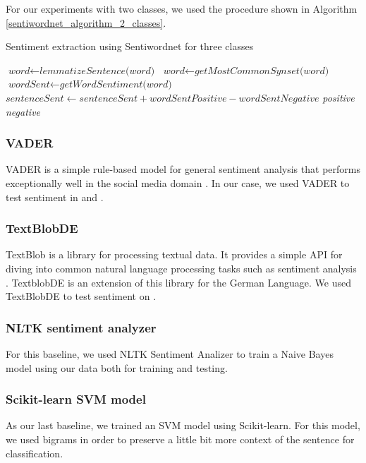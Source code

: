 For our experiments with two classes, we used the procedure shown in Algorithm \ref{sentiwordnet_algorithm_2_classes}.
\begin{algorithm}[h]
\caption{Sentiment extraction using Sentiwordnet for three classes}\label{euclid}
\label{sentiwordnet_algorithm_2_classes}
\begin{algorithmic}[1]
\State $\textit{word} \gets \textit{lemmatizeSentence(word)}$
\State $\textit{word} \gets \textit{getMostCommonSynset(word)}$
\State $\textit{wordSent} \gets \textit{getWordSentiment(word)}$
\State $\textit{sentenceSent} \gets \textit{sentenceSent} + \textit{wordSentPositive} - \textit{wordSentNegative}$
\EndFor
{}
    \Return \textit{positive}
\Else
    \Return \textit{negative}
\EndIf
\EndProcedure
\end{algorithmic}
\end{algorithm}
\subsubsection{VADER}
VADER is a simple rule-based model for general sentiment  analysis that performs  exceptionally well  in  the  social  media  domain \cite{VADERarticle}.
In our case, we used VADER to test sentiment in {\dataEN} and {\dataORG}.
\subsubsection{TextBlobDE}
TextBlob is a library for processing textual data. It provides a simple API for diving into common natural language processing tasks such as sentiment analysis \cite{textblob}. TextblobDE is an extension of this library for the German Language. We used TextBlobDE to test sentiment on \dataDE.
\subsubsection{NLTK sentiment analyzer}
For this baseline, we used NLTK Sentiment Analizer to train a Naive Bayes model using our data both for training and testing.
\subsubsection{Scikit-learn SVM model}
As our last baseline, we trained an SVM model using Scikit-learn. For this model, we used bigrams in order to preserve a little bit more context of the sentence for classification.

